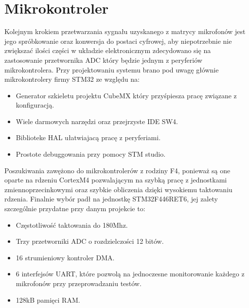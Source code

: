 \documentclass[eng,printmode]{mgr}
\begin{document}
\section{Mikrokontroler}
Kolejnym krokiem przetwarzania sygnału uzyskanego z matrycy mikrofonów jest jego spróbkowanie oraz konwersja do postaci cyfrowej, aby niepotrzebnie nie zwiększać ilości części w układzie elektronicznym zdecydowano się na zastosowanie przetwornika ADC który będzie jednym z peryferiów mikrokontrolera. Przy projektowaniu systemu brano pod uwagę głównie mikrokontrolery firmy STM32 ze względu na:
\begin{itemize}
\item Generator szkieletu projektu CubeMX który przyśpiesza pracę związane z konfiguracją.
\item Wiele darmowych narzędzi oraz przejrzyste IDE SW4.
\item Biblioteke HAL ułatwiajacą pracę z peryferiami.
\item Prostote debuggowania przy pomocy STM studio.
\end{itemize} 
Poszukiwania zawężono do mikrokontrolerów z rodziny F4, ponieważ są one oparte na rdzeniu CortexM4 pozwalającym na szybką pracę z jednostkami zmiennoprzecinkowymi oraz szybkie obliczenia dzięki wysokiemu taktowaniu rdzenia. Finalnie wybór padł na jednostkę STM32F446RET6, jej zalety szczególnie przydatne przy danym projekcie to:
\begin{itemize}
\item Częstotliwość taktowania do 180Mhz.
\item Trzy przetworniki ADC o rozdzielczości 12 bitów.
\item 16 strumieniowy kontroler DMA.
\item 6 interfejsów UART, które pozwolą na jednoczesne monitorowanie każdego z mikrofonów przy przeprowadzaniu testów.
\item 128kB pamięci RAM.
\end{itemize} 


\end{document}
